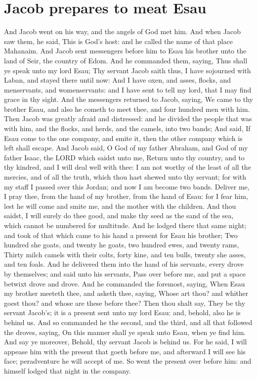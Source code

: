 \section*{Jacob prepares to meat Esau}
\begin{biblechapter} %
\verse And Jacob went on his way, and the angels of God met him.
\verse And when Jacob saw them, he said, This is God's host: and he called the name of that place Mahanaim.
\verse And Jacob sent messengers before him to Esau his brother unto the land of Seir, the country of Edom.
\verse And he commanded them, saying, Thus shall ye speak unto my lord Esau; Thy servant Jacob saith thus, I have sojourned with Laban, and stayed there until now:
\verse And I have oxen, and asses, flocks, and menservants, and womenservants: and I have sent to tell my lord, that I may find grace in thy sight.
\verse And the messengers returned to Jacob, saying, We came to thy brother Esau, and also he cometh to meet thee, and four hundred men with him.
\verse Then Jacob was greatly afraid and distressed: and he divided the people that was with him, and the flocks, and herds, and the camels, into two bands;
\verse And said, If Esau come to the one company, and smite it, then the other company which is left shall escape.
\verse And Jacob said, O God of my father Abraham, and God of my father Isaac, the LORD which saidst unto me, Return unto thy country, and to thy kindred, and I will deal well with thee:
\verse I am not worthy of the least of all the mercies, and of all the truth, which thou hast shewed unto thy servant; for with my staff I passed over this Jordan; and now I am become two bands.
\verse Deliver me, I pray thee, from the hand of my brother, from the hand of Esau: for I fear him, lest he will come and smite me, and the mother with the children.
\verse And thou saidst, I will surely do thee good, and make thy seed as the sand of the sea, which cannot be numbered for multitude.
\verse And he lodged there that same night; and took of that which came to his hand a present for Esau his brother;
\verse Two hundred she goats, and twenty he goats, two hundred ewes, and twenty rams,
\verse Thirty milch camels with their colts, forty kine, and ten bulls, twenty she asses, and ten foals.
\verse And he delivered them into the hand of his servants, every drove by themselves; and said unto his servants, Pass over before me, and put a space betwixt drove and drove.
\verse And he commanded the foremost, saying, When Esau my brother meeteth thee, and asketh thee, saying, Whose art thou? and whither goest thou? and whose are these before thee?
\verse Then thou shalt say, They be thy servant Jacob's; it is a present sent unto my lord Esau: and, behold, also he is behind us.
\verse And so commanded he the second, and the third, and all that followed the droves, saying, On this manner shall ye speak unto Esau, when ye find him.
\verse And say ye moreover, Behold, thy servant Jacob is behind us. For he said, I will appease him with the present that goeth before me, and afterward I will see his face; peradventure he will accept of me.
\verse So went the present over before him: and himself lodged that night in the company.

\end{biblechapter}
